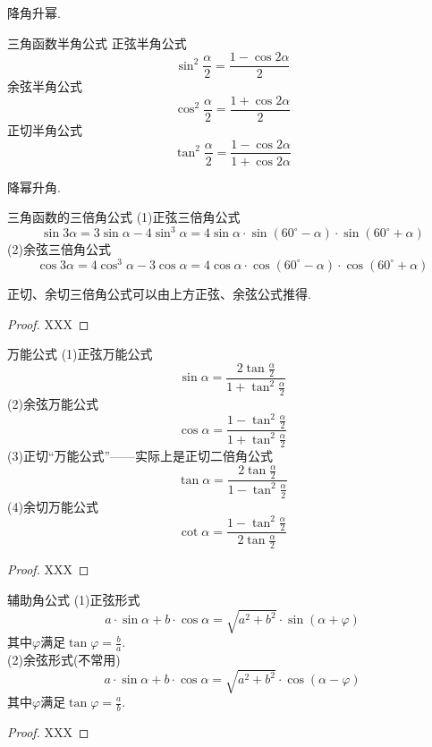 \documentclass[lang=cn, zihao=5]{elegantbook}
\begin{document}
降角升幂.

\begin{proposition}{三角函数半角公式} %
    正弦半角公式$$\sin ^2 \frac{\alpha}{2}=\frac{1-\cos{2\alpha}}{2}$$
    余弦半角公式$$\cos ^2 \frac{\alpha}{2}=\frac{1+\cos{2\alpha}}{2}$$
    正切半角公式$$\tan ^2 \frac{\alpha}{2}=\frac{1-\cos{2\alpha}}{1+\cos{2\alpha}}$$
\end{proposition}

降幂升角.

\begin{proposition}{三角函数的三倍角公式} %
    (1)正弦三倍角公式$$\sin{3\alpha}=3\sin{\alpha}-4\sin^3 \alpha=4\sin{\alpha} \cdot \sin{(60^{\circ}-\alpha)} \cdot \sin{(60^{\circ}+\alpha)}$$
    (2)余弦三倍角公式$$\cos{3\alpha}=4\cos^3 \alpha-3\cos{\alpha}=4\cos{\alpha} \cdot \cos{(60^{\circ}-\alpha)} \cdot \cos{(60^{\circ}+\alpha)}$$
\end{proposition}
\begin{remark}
    正切、余切三倍角公式可以由上方正弦、余弦公式推得.
\end{remark}
\begin{proof}
    XXX
\end{proof}

\begin{proposition}{万能公式} %
    (1)正弦万能公式$$\sin{\alpha}=\frac{2\tan{\frac{\alpha}{2}}}{1+\tan^2{\frac{\alpha}{2}}}$$
    (2)余弦万能公式$$\cos{\alpha}=\frac{1-\tan^2{\frac{\alpha}{2}}}{1+\tan^2{\frac{\alpha}{2}}}$$
    (3)正切“万能公式”——实际上是正切二倍角公式$$\tan{\alpha}=\frac{2\tan{\frac{\alpha}{2}}}{1-\tan^2{\frac{\alpha}{2}}}$$
    (4)余切万能公式$$\cot{\alpha}=\frac{1-\tan^2{\frac{\alpha}{2}}}{2\tan{\frac{\alpha}{2}}}$$
\end{proposition}
\begin{proof}
    XXX
\end{proof}

\begin{proposition}{辅助角公式}
    (1)正弦形式$$a \cdot \sin{\alpha} + b \cdot \cos{\alpha} = \sqrt{a^2+b^2} \cdot \sin{(\alpha + \varphi)}$$
    其中$\varphi$满足$\tan{\varphi}=\frac{b}{a}$.\\
    (2)余弦形式(不常用)$$a \cdot \sin{\alpha} + b \cdot \cos{\alpha} = \sqrt{a^2+b^2} \cdot \cos{(\alpha - \varphi)}$$
    其中$\varphi$满足$\tan{\varphi}=\frac{a}{b}$.
\end{proposition}
\begin{proof}
    XXX
\end{proof}
\end{document}
